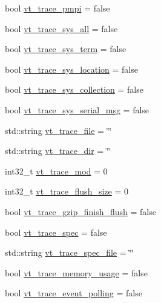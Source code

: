 \begin{DoxyCompactItemize}
bool \hyperlink{structvt_1_1arguments_1_1_app_config_a68a2d29db4c6ebd4ca3cc0141cf151d4}{vt\+\_\+trace\+\_\+pmpi} = false
\item 
bool \hyperlink{structvt_1_1arguments_1_1_app_config_a97d8aa275d3c1368d347bb9e88e1abe0}{vt\+\_\+trace\+\_\+sys\+\_\+all} = false
\item 
bool \hyperlink{structvt_1_1arguments_1_1_app_config_a723e9f8cd1422d47d0294dcb951261f7}{vt\+\_\+trace\+\_\+sys\+\_\+term} = false
\item 
bool \hyperlink{structvt_1_1arguments_1_1_app_config_a91260efaad41abe7d191ba4771b45785}{vt\+\_\+trace\+\_\+sys\+\_\+location} = false
\item 
bool \hyperlink{structvt_1_1arguments_1_1_app_config_a50becf5c6101368f5d9c6884e190fed3}{vt\+\_\+trace\+\_\+sys\+\_\+collection} = false
\item 
bool \hyperlink{structvt_1_1arguments_1_1_app_config_a50afef339e662908db55e0d60bde2d40}{vt\+\_\+trace\+\_\+sys\+\_\+serial\+\_\+msg} = false
\item 
std\+::string \hyperlink{structvt_1_1arguments_1_1_app_config_ad445cf8321e97a3e5da0fa7923690fa8}{vt\+\_\+trace\+\_\+file} = \char`\"{}\char`\"{}
\item 
std\+::string \hyperlink{structvt_1_1arguments_1_1_app_config_a05efd2295aa43237c029cc2b24f0e788}{vt\+\_\+trace\+\_\+dir} = \char`\"{}\char`\"{}
\item 
int32\+\_\+t \hyperlink{structvt_1_1arguments_1_1_app_config_afa2e36bf17ed46ca812263f523533353}{vt\+\_\+trace\+\_\+mod} = 0
\item 
int32\+\_\+t \hyperlink{structvt_1_1arguments_1_1_app_config_a537883e43e43508431626e90886edd92}{vt\+\_\+trace\+\_\+flush\+\_\+size} = 0
\item 
bool \hyperlink{structvt_1_1arguments_1_1_app_config_acbb68fc6506646d49bb061156e9df0ff}{vt\+\_\+trace\+\_\+gzip\+\_\+finish\+\_\+flush} = false
\item 
bool \hyperlink{structvt_1_1arguments_1_1_app_config_ade1d955e557ed03865dbb4317bb69c22}{vt\+\_\+trace\+\_\+spec} = false
\item 
std\+::string \hyperlink{structvt_1_1arguments_1_1_app_config_abd5bcb7a9ca53be8eafc28e2cbd18290}{vt\+\_\+trace\+\_\+spec\+\_\+file} = \char`\"{}\char`\"{}
\item 
bool \hyperlink{structvt_1_1arguments_1_1_app_config_a39c140474cc43ea0d8bca36359ffd86a}{vt\+\_\+trace\+\_\+memory\+\_\+usage} = false
\item 
bool \hyperlink{structvt_1_1arguments_1_1_app_config_a43da3e179ed4ad72411a41b46fae97e0}{vt\+\_\+trace\+\_\+event\+\_\+polling} = false

\end{DoxyCompactItemize}
